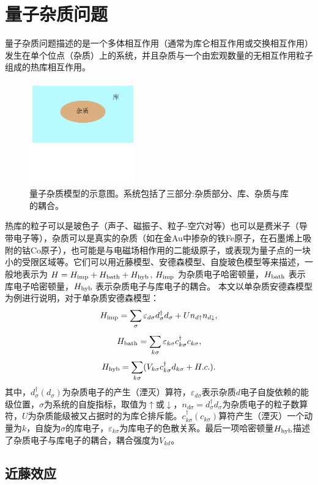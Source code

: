 \documentclass[twoside]{LZUthesis}
\begin{document}
\section{量子杂质问题}
量子杂质问题描述的是一个多体相互作用（通常为库仑相互作用或交换相互作用）发生在单个位点（杂质）上的系统，并且杂质与一个由宏观数量的无相互作用粒子组成的热库相互作用。
\begin{figure}[!hb]
\centering
\includegraphics[width=0.4\textwidth]{QIM.png}
\caption{量子杂质模型的示意图。系统包括了三部分:杂质部分、库、杂质与库的耦合。}
\end{figure}
热库的粒子可以是玻色子（声子、磁振子、粒子-空穴对等）也可以是费米子（导带电子等），杂质可以是真实的杂质（如在金Au中掺杂的铁Fe原子，在石墨烯上吸附的钴Co原子），也可能是与电磁场相作用的二能级原子，或表现为量子点的一块小的受限区域等。它们可以用近藤模型、安德森模型、自旋玻色模型等来描述，一般地表示为 $H = H_{\rm{imp}} + H_{\rm{bath}} + H_{\rm{hyb}}$, $H_{\rm{imp}}$ 为杂质电子哈密顿量，$H_{\rm{bath}}$ 表示库电子哈密顿量，$H_{\rm{hyb}}$ 表示杂质电子与库电子的耦合。
本文以单杂质安德森模型为例进行说明，对于单杂质安德森模型：
\[
H_{\rm{imp}} = \sum_{\sigma} \varepsilon_{d\sigma}d^{\dag}_{\sigma}d_{\sigma} + Un_{d\uparrow}n_{d\downarrow},
\]
\[
H_{\rm{bath}} = \sum_{k\sigma}\varepsilon_{k\sigma}c^{\dag}_{k\sigma}c_{k\sigma},
\]
\[
H_{\rm{hyb}} = \sum_{k\sigma}(V_{k\sigma}c^{\dag}_{k\sigma}d_{k\sigma} + H.c.).
\]
其中，$d^{\dag}_{\sigma}(d_{\sigma})$为杂质电子的产生（湮灭）算符，$\varepsilon_{d\sigma}$表示杂质$d$电子自旋依赖的能级位置，$\sigma$为系统的自旋指标，取值为$\uparrow$或$\downarrow$，$n_{d\sigma}=d^{\dag}_{\sigma}d_{\sigma}$为杂质电子的粒子数算符，$U$为杂质能级被又占据时的为库仑排斥能。$c^{\dag}_{k\sigma}(c_{k\sigma})$算符产生（湮灭）一个动量为$k$，自旋为$\sigma$的库电子，$\varepsilon_{k\sigma}$为库电子的色散关系。最后一项哈密顿量$H_{\rm{hyb}}$描述了杂质电子与库电子的耦合，耦合强度为$V_{kd}$。
\subsection{近藤效应}
\end{document}

